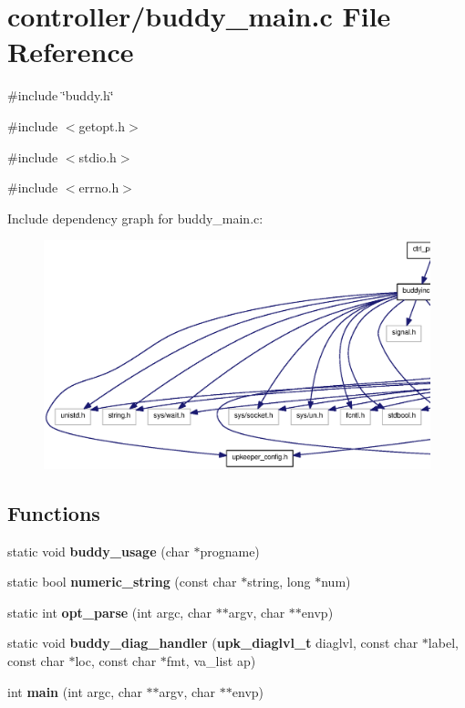 \section{controller/buddy\_\-main.c File Reference}
\label{buddy__main_8c}
{\ttfamily \#include \char`\"{}buddy.h\char`\"{}}\par
{\ttfamily \#include $<$getopt.h$>$}\par
{\ttfamily \#include $<$stdio.h$>$}\par
{\ttfamily \#include $<$errno.h$>$}\par
Include dependency graph for buddy\_\-main.c:\nopagebreak
\begin{figure}[H]
\begin{center}
\leavevmode
\includegraphics[width=400pt]{buddy__main_8c__incl}
\end{center}
\end{figure}
\subsection*{Functions}
\begin{DoxyCompactItemize}
\item 
static void {\bf buddy\_\-usage} (char $\ast$progname)
\item 
static bool {\bf numeric\_\-string} (const char $\ast$string, long $\ast$num)
\item 
static int {\bf opt\_\-parse} (int argc, char $\ast$$\ast$argv, char $\ast$$\ast$envp)
\item 
static void {\bf buddy\_\-diag\_\-handler} ({\bf upk\_\-diaglvl\_\-t} diaglvl, const char $\ast$label, const char $\ast$loc, const char $\ast$fmt, va\_\-list ap)
\item 
int {\bf main} (int argc, char $\ast$$\ast$argv, char $\ast$$\ast$envp)
\end{DoxyCompactItemize}


